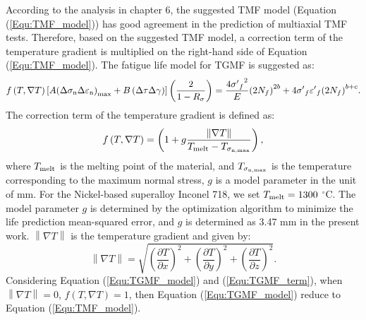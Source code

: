 \documentclass[preprint,5p,twocolumn,11pt,sort&compress]{elsarticle}
\begin{document}
According to the analysis in chapter 6, the suggested TMF model (Equation (\autoref{Equ:TMF_model})) has good agreement in the prediction of multiaxial TMF tests.
Therefore, based on the suggested TMF model, a correction term of the temperature gradient is multiplied on the right-hand side of Equation (\autoref{Equ:TMF_model}). The fatigue life model for TGMF is suggested as:
\begin{equation}
f\left( {T,\nabla T} \right)\left[ {A{{\left( {\Delta {\sigma _{\rm n}}\Delta {\varepsilon _{\rm n}}} \right)}_{\max }} + B\left( {\Delta \tau \Delta \gamma } \right)} \right]\left( {\frac{2}{{1 - {R_\sigma }}}} \right) = \frac{{4{{\sigma '}_f}^2}}{E}{\left( {2{N_f}} \right)^{2b}} + 4{{\sigma '}_f}{{\varepsilon '}_f}{\left( {2{N_f}} \right)^{b + c}}.
\label{Equ:TGMF_model}
\end{equation}
The correction term of the temperature gradient is defined as:
\begin{equation}
f\left( {T,\nabla T} \right) = \left( {1 + g\frac{{\left\| {\nabla T} \right\|}}{{{T_{{\rm{melt}}}} - {T_{{\sigma _{\rm n,\max }}}}}}} \right),
\label{Equ:TGMF_term}
\end{equation}
where ${T_{{\rm{melt}}}}$ is the melting point of the material, and ${T_{{\sigma _{\rm n,\max }}}}$ is the temperature corresponding to the maximum normal stress, $g$ is a model parameter in the unit of mm. For the Nickel-based superalloy Inconel 718, we set ${T_{{\rm{melt}}}}=1300$ $^\circ$C. The model parameter $g$ is determined by the optimization algorithm to minimize the life prediction
mean-squared error, and $g$ is determined as 3.47 mm in the present work. ${\left\| {\nabla T} \right\|}$ is the temperature gradient and given by:
\begin{equation}
\left\| {\nabla T} \right\| = \sqrt {{{\left( {\frac{{\partial T}}{{\partial x}}} \right)}^2} + {{\left( {\frac{{\partial T}}{{\partial y}}} \right)}^2} + {{\left( {\frac{{\partial T}}{{\partial z}}} \right)}^2}}.
\end{equation}
Considering Equation (\eqref{Equ:TGMF_model}) and (\eqref{Equ:TGMF_term}), when $\left\| {\nabla T} \right\|=0$, $f\left( {T,\nabla T} \right)=1$, then Equation (\eqref{Equ:TGMF_model}) reduce to Equation (\eqref{Equ:TMF_model}).
\end{document}
